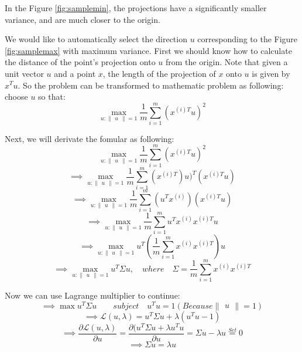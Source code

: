\documentclass[a4paper]{article}
\begin{document}
In the Figure \ref{fig:samplemin}, the projections have a significantly smaller variance, and are much closer to the origin.

We would like to automatically select the direction $u$ corresponding to the Figure \ref{fig:samplemax} with maximum variance.  First we should know how to calculate the distance of the point's projection onto $u$ from the origin. Note that given a unit vector $u$ and a point $x$, the length of the projection of $x$ onto $u$ is given by $x^{T}u$. So the problem can be transformed to mathematic problem as following: choose $u$ so that:
$$
	\max_{u:\begin{Vmatrix}u\end{Vmatrix}=1} \frac{1}{m} \sum_{i=1}^{m}(x^{(i)T}u)^{2}
$$

Next, we will derivate the fomular as following:
$$
	\max_{u:\begin{Vmatrix}u\end{Vmatrix}=1} \frac{1}{m} \sum_{i=1}^{m}(x^{(i)T}u)^{2}
$$
$$
	\implies \max_{u:\begin{Vmatrix}u\end{Vmatrix}=1} \frac{1}{m} \sum_{i=1}^{m}(x^{(i)T})u)^{T}(x^{(i)T}u)
$$
$$
	\implies \max_{u:\begin{Vmatrix}u\end{Vmatrix}=1} \frac{1}{m} \sum_{i=1}^{m}(u^Tx^{(i)})(x^{(i)T}u)
$$
$$
	\implies \max_{u:\begin{Vmatrix}u\end{Vmatrix}=1} \frac{1}{m} \sum_{i=1}^{m}u^Tx^{(i)}x^{(i)T}u
$$
$$
	\implies \max_{u:\begin{Vmatrix}u\end{Vmatrix}=1} u^T (\frac{1}{m}\sum_{i=1}^{m}x^{(i)}x^{(i)T})u
$$
$$
	\implies \max_{u:\begin{Vmatrix}u\end{Vmatrix}=1} u^T \Sigma u, \quad where \quad \Sigma=\frac{1}{m}\sum_{i=1}^{m}x^{(i)}x^{(i)T}
$$

Now we can use Lagrange multiplier to continue: 
$$
	\implies \max u^T \Sigma u
   	\quad \quad subject\quad u^Tu = 1(Because \begin{Vmatrix}u\end{Vmatrix}=1)
$$
$$
	\implies \mathcal{L}(u,\lambda) = u^T \Sigma u + \lambda (u^Tu - 1)
$$
$$
	\implies \frac{\partial \mathcal{L}(u,\lambda)}{\partial u} = \frac{\partial(u^T\Sigma u+\lambda u^Tu}{\partial u}
    = \Sigma u - \lambda u \overset{Set}{=} 0
$$
$$
	\implies \Sigma u = \lambda u
$$
\end{document}
